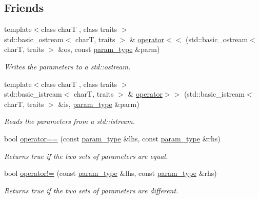 \subsection*{Friends}
\begin{DoxyCompactItemize}
\item 
{\footnotesize template$<$class charT , class traits $>$ }\\std\+::basic\+\_\+ostream$<$ charT, traits $>$ \& \mbox{\hyperlink{classpareto__distribution_1_1param__type_a2dfa898eef3da7b00ae3d8aaa1b8f87c}{operator$<$$<$}} (std\+::basic\+\_\+ostream$<$ charT, traits $>$ \&os, const \mbox{\hyperlink{classpareto__distribution_1_1param__type}{param\+\_\+type}} \&parm)
\begin{DoxyCompactList}\small\item\em Writes the parameters to a std\+::ostream. \end{DoxyCompactList}\item 
{\footnotesize template$<$class charT , class traits $>$ }\\std\+::basic\+\_\+istream$<$ charT, traits $>$ \& \mbox{\hyperlink{classpareto__distribution_1_1param__type_a92d697e987c5ea22b3732a535e3e922d}{operator$>$$>$}} (std\+::basic\+\_\+istream$<$ charT, traits $>$ \&is, \mbox{\hyperlink{classpareto__distribution_1_1param__type}{param\+\_\+type}} \&parm)
\begin{DoxyCompactList}\small\item\em Reads the parameters from a std\+::istream. \end{DoxyCompactList}\item 
bool \mbox{\hyperlink{classpareto__distribution_1_1param__type_ae6f3b58e629ce7a54b5e18a4f05dbc5a}{operator==}} (const \mbox{\hyperlink{classpareto__distribution_1_1param__type}{param\+\_\+type}} \&lhs, const \mbox{\hyperlink{classpareto__distribution_1_1param__type}{param\+\_\+type}} \&rhs)
\begin{DoxyCompactList}\small\item\em Returns true if the two sets of parameters are equal. \end{DoxyCompactList}\item 
bool \mbox{\hyperlink{classpareto__distribution_1_1param__type_aa559d0d98e88e84417364a89b83cf5b2}{operator!=}} (const \mbox{\hyperlink{classpareto__distribution_1_1param__type}{param\+\_\+type}} \&lhs, const \mbox{\hyperlink{classpareto__distribution_1_1param__type}{param\+\_\+type}} \&rhs)
\begin{DoxyCompactList}\small\item\em Returns true if the two sets of parameters are different. \end{DoxyCompactList}\end{DoxyCompactItemize}


